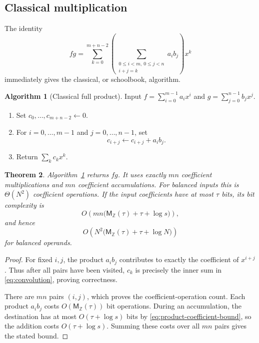 \documentclass[11pt]{book}
\newtheorem{theorem}{Theorem}[section]
\theoremstyle{definition}
\newtheorem{algorithm}[theorem]{Algorithm}
\newcommand{\ZZ}{\mathbb Z}
\newcommand{\MZ}{\mathsf M_{\ZZ}}
\begin{document}
\subsection{Classical multiplication}

The identity
\begin{equation}\label{eq:convolution}
 fg=\sum_{k=0}^{m+n-2}
 \left(\sum_{\substack{0\leq i<m,\ 0\leq j<n\\i+j=k}} a_i b_j\right)x^k
\end{equation}
immediately gives the classical, or schoolbook, algorithm.

\begin{algorithm}[Classical full product]\label{alg:classical-product}
Input $f=\sum_{i=0}^{m-1}a_ix^i$ and
$g=\sum_{j=0}^{n-1}b_jx^j$.
\begin{enumerate}
 \item Set $c_0,\ldots,c_{m+n-2}\leftarrow0$.
 \item For $i=0,\ldots,m-1$ and $j=0,\ldots,n-1$, set
 \[
    c_{i+j}\leftarrow c_{i+j}+a_i b_j.
 \]
 \item Return $\sum_k c_kx^k$.
\end{enumerate}
\end{algorithm}

\begin{theorem}\label{thm:classical-correctness-complexity}
Algorithm~\ref{alg:classical-product} returns $fg$.  It uses exactly $mn$
coefficient multiplications and $mn$ coefficient accumulations.  For balanced
inputs this is $\Theta(N^2)$ coefficient operations.  If the input
coefficients have at most $\tau$ bits, its bit complexity is
\[
 O\!\left(mn\bigl(\MZ(\tau)+\tau+\log s\bigr)\right),
\]
and hence
\[
 O\!\left(N^2\bigl(\MZ(\tau)+\tau+\log N\bigr)\right)
\]
for balanced operands.
\end{theorem}

\begin{proof}
For fixed $i,j$, the product $a_i b_j$ contributes to exactly the coefficient
of $x^{i+j}$.  Thus after all pairs have been visited, $c_k$ is precisely the
inner sum in \eqref{eq:convolution}, proving correctness.

There are $mn$ pairs $(i,j)$, which proves the coefficient-operation count.
Each product $a_i b_j$ costs $O(\MZ(\tau))$ bit operations.  During an
accumulation, the destination has at most $O(\tau+\log s)$ bits by
\eqref{eq:product-coefficient-bound}, so the addition costs
$O(\tau+\log s)$.  Summing these costs over all $mn$ pairs gives the stated
bound.
\end{proof}
\end{document}
